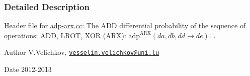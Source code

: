 \subsubsection{\-Detailed \-Description}
\-Header file for \hyperlink{adp-arx_8cc}{adp-\/arx.\-cc}\-: \-The \-A\-D\-D differential probability of the sequence of operations\-: \hyperlink{common_8hh_af3b709fb668cf93ca09e2a46a2a031a8}{\-A\-D\-D}, \hyperlink{common_8hh_abe2030c44a97657e1b1dbe9b0e093a7b}{\-L\-R\-O\-T}, \hyperlink{common_8hh_a6de9ec3b3b57377b69a82239ea52ec6e}{\-X\-O\-R} (\hyperlink{common_8hh_a7d3da57c58af293c7c57e4f1b551849d}{\-A\-R\-X})\-: $\mathrm{adp}^{\mathrm{ARX}}(da,db,dd \rightarrow de)$. . \begin{DoxyAuthor}{\-Author}
\-V.\-Velichkov, \href{mailto:vesselin.velichkov@uni.lu}{\tt vesselin.\-velichkov@uni.\-lu} 
\end{DoxyAuthor}
\begin{DoxyDate}{\-Date}
2012-\/2013 
\end{DoxyDate}


